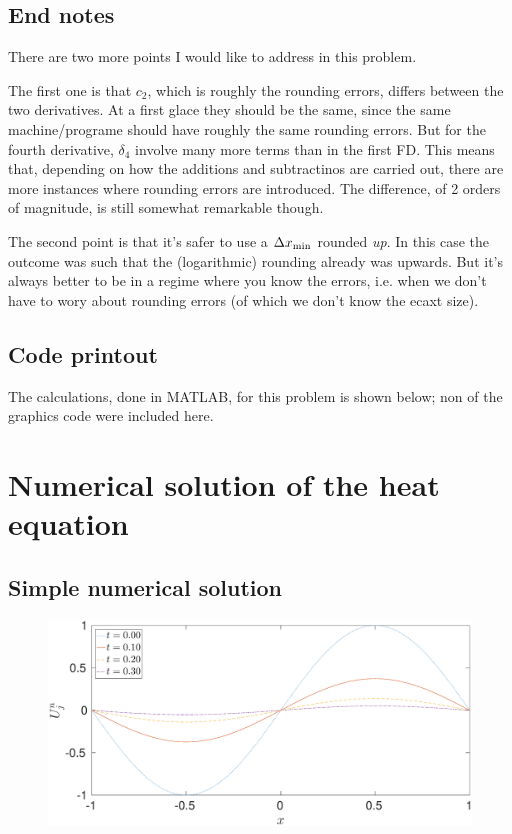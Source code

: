 \documentclass[11pt,letter, swedish, english
]{article}
\begin{document}
\subsection*{End notes}
There are two more points I would like to address in this problem.

The first one is that $c_2$, which is roughly the rounding errors,
differs between the two derivatives. At a first glace they should be
the same, since the same machine/programe should have roughly the same
rounding errors. But for the fourth derivative, $\delta_4$ involve
many more terms than in the first FD. This means that, depending on
how the additions and subtractinos are carried out, there are more
instances where rounding errors are introduced. The difference, of 2
orders of magnitude, is still somewhat remarkable though. 

The second point is that it's safer to use a $\Delta{x}_\text{min}$ rounded
\emph{up}. In this case the outcome was such that the (logarithmic)
rounding already was upwards. But it's always better to be in a
regime where you know the errors, i.e. when we don't have to wory
about rounding errors (of which we don't know the ecaxt size).

\subsection*{Code printout}
The calculations, done in MATLAB, for this problem is shown below; non
of the graphics code were included here.





\section{Numerical solution of the heat equation}

\subsection{Simple numerical solution}
\begin{figure}\centering
\includegraphics[width=1\textwidth]{4a.eps}
\caption{}
\label{fig:4a}
\end{figure}
\end{document}
